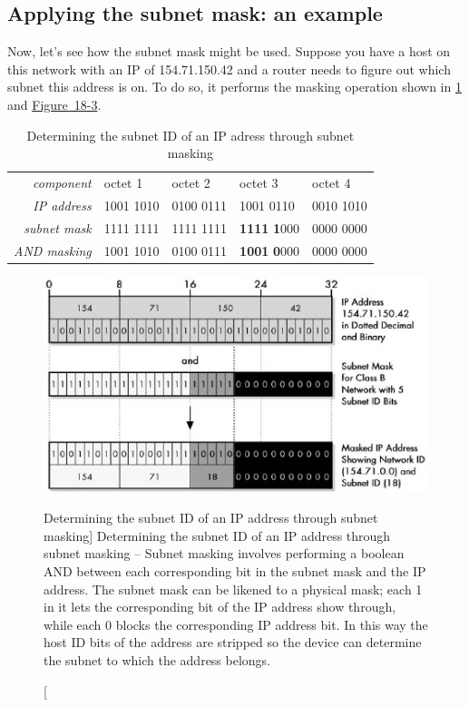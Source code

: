 \subsection{Applying the subnet mask: an example}

Now, let's see how the subnet mask might be used. Suppose you have a
host on this network with an IP of 154.71.150.42 and a router needs to
figure out which subnet this address is on.
To do so, it performs the masking operation shown in \cref{tab:determining-prefix}
and
\protect\hyperlink{ch18s03.htmlux5cux23determining_the_subnet_id_of_an_ip-id001}{Figure~18-3}.

\begin{table}
   \centering
   \begin{tabular}{rllll}
   \textit{component}   & octet 1   & octet 2   & octet 3                     & octet 4   \\[1ex]
   \textit{IP address}  & 1001 1010 & 0100 0111 & 1001 0110                   & 0010 1010 \\
   \textit{subnet mask} & 1111 1111 & 1111 1111 & \textbf{1111} \textbf{1}000 & 0000 0000 \\
   \textit{AND masking} & 1001 1010 & 0100 0111 & \textbf{1001} \textbf{0}000 & 0000 0000 \\
   \end{tabular}
   \caption{Determining the subnet ID of an IP adress through subnet masking}
   \label{tab:determining-prefix}
\end{table}


\begin{figure}
   \centering
   \includegraphics[width=.7\textwidth]{images/determining-prefix.jpg}
   \caption
      [Determining the subnet ID of an IP address through subnet masking]
      {Determining the subnet ID of an IP address through subnet masking -- Subnet masking involves performing a boolean AND between each
      corresponding bit in the subnet mask and the IP address.
      The subnet mask can be likened to a physical mask; each 1 in it lets the corresponding bit of the IP address show through, while each 0 blocks the
      corresponding IP address bit.
      In this way the host ID bits of the address are stripped so the device can determine the subnet to which the address belongs.}
   \label{fig:determining-prefix}
\end{figure}


